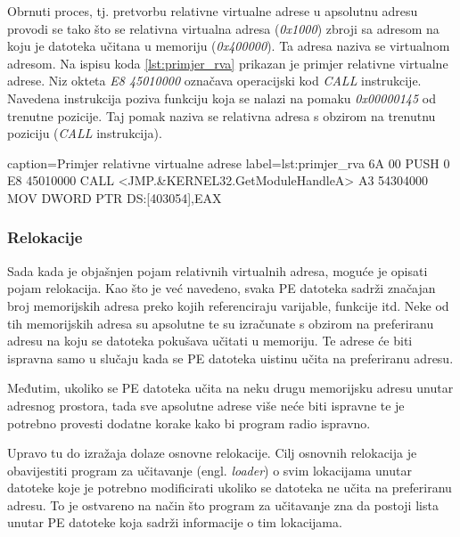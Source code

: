 \documentclass[times, utf8, diplomski, numeric]{fer}
\begin{document}
Obrnuti proces, tj. pretvorbu relativne virtualne adrese u
apsolutnu adresu provodi se tako što se relativna virtualna
adresa (\emph{0x1000}) zbroji sa adresom na koju je datoteka
učitana u memoriju (\emph{0x400000}). Ta adresa naziva se
virtualnom adresom. Na ispisu koda \ref{lst:primjer_rva} 
prikazan je primjer relativne virtualne adrese. Niz okteta
\emph{E8 45010000} označava operacijski kod \emph{CALL}
instrukcije. Navedena instrukcija poziva funkciju koja se nalazi
na pomaku \emph{0x00000145} od trenutne pozicije. Taj pomak
naziva se relativna adresa s obzirom na trenutnu poziciju 
(\emph{CALL} instrukcija). 

\begin{ispis} {caption=Primjer relativne virtualne adrese} {label=lst:primjer_rva}
6A 00	                      PUSH 0
E8 45010000                   CALL <JMP.&KERNEL32.GetModuleHandleA>
A3 54304000                   MOV DWORD PTR DS:[403054],EAX
\end{ispis}

\subsubsection{Relokacije}

Sada kada je objašnjen pojam relativnih virtualnih adresa, moguće
je opisati pojam relokacija. Kao što je već navedeno, svaka PE
datoteka sadrži značajan broj memorijskih adresa preko kojih
referenciraju varijable, funkcije itd. Neke od tih memorijskih adresa %
su apsolutne te su izračunate s obzirom na preferiranu
adresu na koju se datoteka pokušava učitati u memoriju. Te adrese
će biti ispravna samo u slučaju kada se PE datoteka uistinu učita
na preferiranu adresu.

Međutim, ukoliko se PE datoteka učita na neku drugu memorijsku
adresu unutar adresnog prostora, tada sve apsolutne adrese više
neće biti ispravne te je potrebno provesti dodatne korake kako bi
program radio ispravno. 

Upravo tu do izražaja dolaze osnovne relokacije. Cilj osnovnih
relokacija je obavijestiti program za učitavanje 
(engl. \emph{loader}) o svim lokacijama unutar datoteke koje je
potrebno modificirati ukoliko se datoteka ne učita na preferiranu
adresu. To je ostvareno na način što program za učitavanje zna da
postoji lista unutar PE datoteke koja sadrži informacije o tim
lokacijama.
\end{document}
